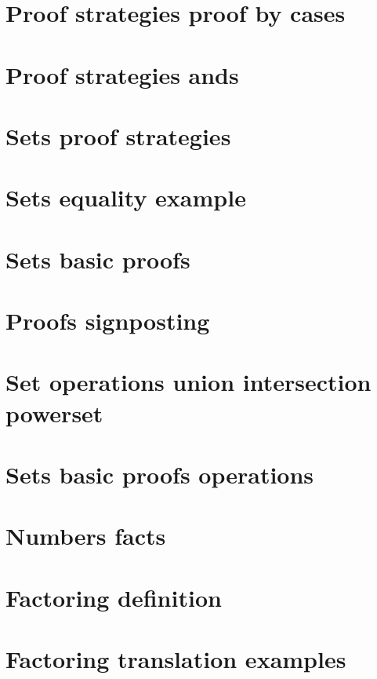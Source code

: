 \section*{Proof strategies proof by cases}

\vfill
\section*{Proof strategies ands}

\vfill
\section*{Sets proof strategies}

\vfill
\section*{Sets equality example}

\vfill
\section*{Sets basic proofs}

\vfill
\section*{Proofs signposting}

\vfill
\section*{Set operations union intersection powerset}

\vfill
\section*{Sets basic proofs operations}

\vfill
\section*{Numbers facts}

\vfill
\section*{Factoring definition}

\vfill
\section*{Factoring translation examples}

\vfill
